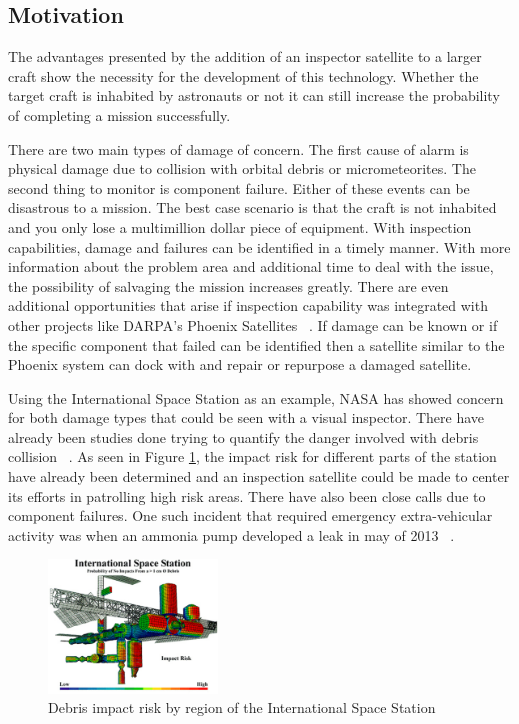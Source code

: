 \documentclass[journal, 10pt]{IEEEtran}
\begin{document}
\subsection{Motivation}
The advantages presented by the addition of an inspector satellite to a larger craft show the necessity for the development of this technology.  Whether the target craft is inhabited by astronauts or not it can still increase the probability of completing a mission successfully.

There are two main types of damage of concern.  The first cause of alarm is physical damage due to collision with orbital debris or micrometeorites.  The second thing to monitor is component failure.  Either of these events can be disastrous to a mission.  The best case scenario is that the craft is not inhabited and you only lose a multimillion dollar piece of equipment.  With inspection capabilities, damage and failures can be identified in a timely manner.  With more information about the problem area and additional time to deal with the issue, the possibility of salvaging the mission increases greatly.  There are even additional opportunities that arise if inspection capability was integrated with other projects like DARPA’s Phoenix Satellites ~\cite{Phoenix}.  If damage can be known or if the specific component that failed can be identified then a satellite similar to the Phoenix system can dock with and repair or repurpose a damaged satellite.


Using the International Space Station as an example, NASA has showed concern for both damage types that could be seen with a visual inspector.  There have already been studies done trying to quantify the danger involved with debris collision ~\cite{Risk}.  As seen in Figure \ref{ISS_risk}, the impact risk for different parts of the station have already been determined and an inspection satellite could be made to center its efforts in patrolling high risk areas.  There have also been close calls due to component failures.  One such incident that required emergency extra-vehicular activity was when an ammonia pump developed a leak in may of 2013 ~\cite{Ammonia}.

\begin{figure}[H]
\begin{center}
\includegraphics[width=0.4\textwidth]{figures/ISS_impact_risk}
\caption{Debris impact risk by region of the International Space Station}
\label{ISS_risk}
\end{center}
\end{figure}
\end{document}
